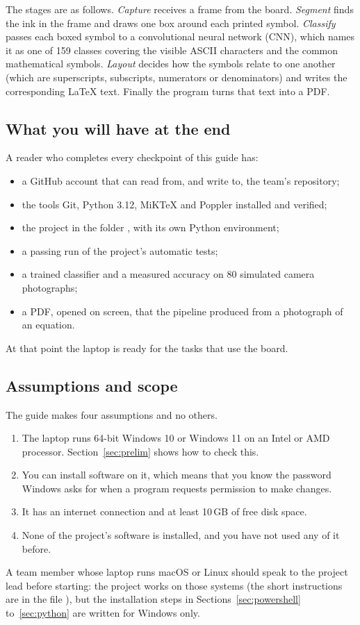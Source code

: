 The stages are as follows. \emph{Capture} receives a frame from the board. \emph{Segment} finds
the ink in the frame and draws one box around each printed symbol. \emph{Classify} passes each
boxed symbol to a convolutional neural network (CNN), which names it as one of 159 classes
covering the visible ASCII characters and the common mathematical symbols. \emph{Layout} decides
how the symbols relate to one another (which are superscripts, subscripts, numerators or
denominators) and writes the corresponding \LaTeX{} text. Finally the program 
turns that text into a PDF.

\subsection{What you will have at the end}

A reader who completes every checkpoint of this guide has:
\begin{itemize}
\item a GitHub account that can read from, and write to, the team's repository;
\item the tools Git, Python 3.12, MiKTeX and Poppler installed and verified;
\item the project in the folder , with its own Python
  environment;
\item a passing run of the project's automatic tests;
\item a trained classifier and a measured accuracy on 80 simulated camera photographs;
\item a PDF, opened on screen, that the pipeline produced from a photograph of an equation.
\end{itemize}
At that point the laptop is ready for the tasks that use the board.

\subsection{Assumptions and scope}

The guide makes four assumptions and no others.
\begin{enumerate}
\item The laptop runs 64-bit Windows 10 or Windows 11 on an Intel or AMD processor.
  Section~\ref{sec:prelim} shows how to check this.
\item You can install software on it, which means that you know the password Windows asks for
  when a program requests permission to make changes.
\item It has an internet connection and at least 10\,GB of free disk space.
\item None of the project's software is installed, and you have not used any of it before.
\end{enumerate}
A team member whose laptop runs macOS or Linux should speak to the project lead before starting:
the project works on those systems (the short instructions are in the file ), but
the installation steps in Sections~\ref{sec:powershell} to~\ref{sec:python} are written for
Windows only.


